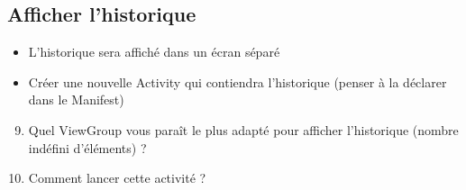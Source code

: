 \documentclass{article}
\begin{document}
\subsection{Afficher l'historique}
\begin{itemize}
\item L'historique sera affiché dans un écran séparé
\item Créer une nouvelle Activity qui contiendra l'historique (penser à la déclarer dans le Manifest)
\end{itemize}
\begin{enumerate}
 \setcounter{enumi}{8}
\item Quel ViewGroup vous paraît le plus adapté pour afficher l'historique (nombre indéfini d'éléments) ?
\item Comment lancer cette activité ?
\end{enumerate}
\end{document}
